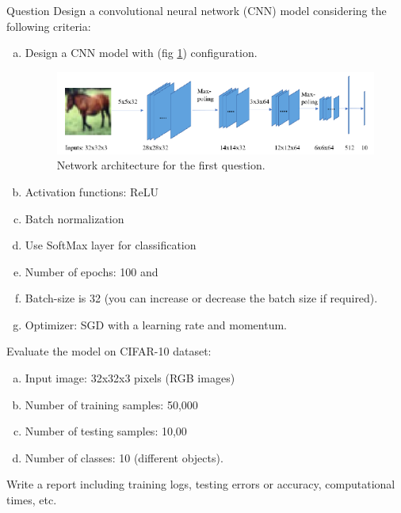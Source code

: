 \documentclass[12pt,oneside,geqno]{article}
\begin{document}
	\begin{Problem}[a]
		Question
		Design a convolutional neural network (CNN) model considering the following criteria:
		
		\begin{enumerate}[a) ]
			\item Design a CNN model with (fig \ref{img:q1_net}) configuration.
			\begin{figure}
				\centering
				\includegraphics[width=\textwidth]{../figs/q1_net.png}
				\caption{Network architecture for the first question.}
				\label{img:q1_net}
			\end{figure}
			
			\item Activation functions: ReLU
			\item Batch normalization
			\item Use SoftMax layer for classification
			\item Number of epochs: 100 and
			\item Batch-size is 32 (you can increase or decrease the batch size if required).
			\item Optimizer: SGD with a learning rate and momentum.
		\end{enumerate}
		
		Evaluate the model on CIFAR-10 dataset:
		
		\begin{enumerate}[a) ]			
			\item Input image: 32x32x3 pixels (RGB images)
			\item Number of training samples: 50,000
			\item Number of testing samples: 10,00
			\item Number of classes: 10 (different objects).
		\end{enumerate}
		
		Write a report including training logs, testing errors or accuracy, computational times, etc.
		
	\end{Problem}
	
\end{document}
